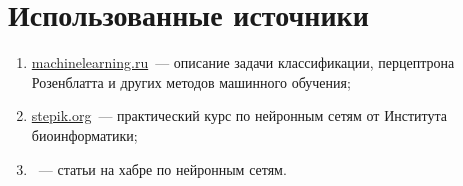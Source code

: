 \section{Использованные источники}
	\begin{enumerate}
		\item \href{http://www.machinelearning.ru/wiki/index.php}{machinelearning.ru}~--- описание задачи классификации,
				перцептрона Розенблатта и других методов машинного обучения;
		\item \href{https://stepik.org/course/401}{stepik.org}~--- практический курс по нейронным сетям от Института биоинформатики;
		\item ~--- статьи на хабре по нейронным сетям.
	\end{enumerate}
